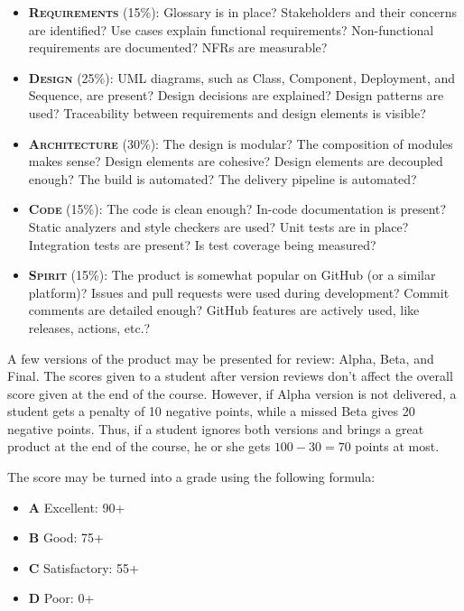 \documentclass[nobrand,anonymous,nodate,nosecurity]{huawei}
\begin{document}
\begin{itemize}
\item {\bfseries\scshape Requirements} (15\%):
  Glossary is in place?
  Stakeholders and their concerns are identified?
  Use cases explain functional requirements?
  Non-functional requirements are documented?
  NFRs are measurable?
\item {\bfseries\scshape Design} (25\%):
  UML diagrams, such as Class, Component, Deployment, and Sequence, are present?
  Design decisions are explained?
  Design patterns are used?
  Traceability between requirements and design elements is visible?
\item {\bfseries\scshape Architecture} (30\%):
  The design is modular?
  The composition of modules makes sense?
  Design elements are cohesive?
  Design elements are decoupled enough?
  The build is automated?
  The delivery pipeline is automated?
\item {\bfseries\scshape Code} (15\%):
  The code is clean enough?
  In-code documentation is present?
  Static analyzers and style checkers are used?
  Unit tests are in place?
  Integration tests are present?
  Is test coverage being measured?
\item {\bfseries\scshape Spirit} (15\%):
  The product is somewhat popular on GitHub (or a similar platform)?
  Issues and pull requests were used during development?
  Commit comments are detailed enough?
  GitHub features are actively used, like releases, actions, etc.?
\end{itemize}

A few versions of the product may be presented for review:
Alpha, Beta, and Final. The scores given to a student
after version reviews don't affect the overall
score given at the end of the course. However, if Alpha
version is not delivered, a student gets a penalty of 10 negative points,
while a missed Beta gives 20 negative points. Thus, if a student
ignores both versions and brings a great product at the end of the course,
he or she gets $100-30=70$ points at most.

The score may be turned into a grade using the following formula:

\begin{itemize}
\item \textbf{A} Excellent: 90+
\item \textbf{B} Good: 75+
\item \textbf{C} Satisfactory: 55+
\item \textbf{D} Poor: 0+
\end{itemize}
\end{document}
